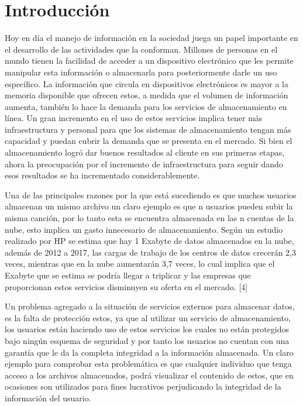 \chapter{Introducci\'on} %
\label{cha:introduccion}
Hoy en día el manejo de información en la sociedad juega un papel importante en el desarrollo de las actividades que la conforman. Millones de personas en el mundo tienen la facilidad de acceder a un dispositivo electrónico que les permite manipular esta información o almacenarla para posteriormente darle un uso específico. La información que circula en dispositivos electrónicos es mayor a la memoria disponible que ofrecen estos, a medida que el volumen de información aumenta, también lo hace la demanda para los servicios de almacenamiento en línea. Un gran incremento en el uso de estos servicios implica tener más infraestructura y personal para que los sistemas de almacenamiento tengan más capacidad y puedan cubrir la demanda que se presenta en el mercado. Si bien el almacenamiento logró dar buenos resultados al cliente en sus primeras etapas, ahora la preocupación por el incremento de infraestructura para seguir dando esos resultados se ha incrementado considerablemente. ~\cite{Bellare} ~\cite{Keelveedhi}

Una de las principales razones por la que está sucediendo es que muchos usuarios almacenan un mismo archivo un claro ejemplo es que n usuarios pueden subir la misma canción, por lo tanto esta se encuentra almacenada en las n cuentas de la nube, esto implica un gasto innecesario de almacenamiento. Según un estudio realizado por HP se estima que hay 1 Exabyte de datos almacenados en la nube, además de 2012 a 2017, las cargas de trabajo de los centros de datos crecerán 2,3 veces, mientras que en la nube aumentarán 3,7 veces, lo cual implica que el Exabyte que se estima se podría llegar a triplicar y las empresas que proporcionan estos servicios disminuyen su oferta en el mercado. [4]

Un problema agregado a la situación de servicios externos para almacenar datos, es la falta de protección estos, ya que al utilizar un servicio de almacenamiento, los usuarios están haciendo uso de estos servicios los cuales no están protegidos bajo ningún esquema de seguridad y por tanto los usuarios no cuentan con una garantía que le da la completa integridad a la información almacenada. Un claro ejemplo para comprobar esta problemática es que cualquier individuo que tenga acceso a los archivos almacenados, podrá visualizar el contenido de estos, que en ocasiones son utilizados para fines lucrativos perjudicando la integridad de la información del usuario.

